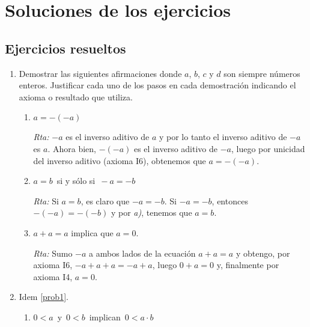 \appendix


\part{Soluciones de los ejercicios} 

\setcounter{chapter}{0}
\renewcommand{\thechapter}{R\arabic{chapter}}

\newcommand{\rta}{\noindent\textit{Rta: }} 

\chapter{Ejercicios resueltos}\label{ej-resueltos-1}

\begin{enumerate}
		
		
    \item\label{prob1} Demostrar las siguientes afirmaciones donde $a$, $b$, $c$ y $d$ son siempre números enteros. Justificar cada uno de los pasos en cada demostración indicando el axioma o resultado que utiliza.
    \begin{enumerate}
        \item  $a=-(-a)$
        
        \rta $-a$  es el inverso aditivo de $a$ y por lo tanto el inverso aditivo de $-a$ es $a$.  Ahora bien, $-(-a)$  es el inverso aditivo de  $-a$, luego por  unicidad del inverso aditivo (axioma { I6}), obtenemos que $a = -(-a)$.
        
        \item  $a=b\,$ si y sólo si $\,-a=-b$
        
        \rta Si  $a=b$, es claro que $-a=-b$. Si $-a= -b$, entonces $-(-a) = -(-b)$ y  por \textit{a)}, tenemos que $a=b$.  
        
        \item  $a+a=a$ implica que  $a=0$.
        
        \rta Sumo $-a$ a ambos lados de la ecuación  $a+a=a$ y obtengo, por axioma I6,  $-a + a + a = -a +a$, luego $0 +a = 0$ y, finalmente por axioma I4, $a=0$. 
        
    \end{enumerate}
    

    \item Idem \ref{prob1}.
    
    \begin{enumerate}
        \item $0<a\,$ y $\,0<b\,$ implican $\,0<a\cdot b$
        

\end{enumerate}
\end{enumerate}
